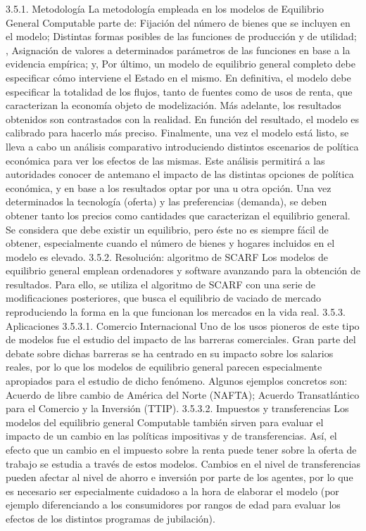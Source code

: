 \documentclass[10pt,a4paper]{article}
\begin{document}
3.5.1. Metodología
La metodología empleada en los modelos de Equilibrio General Computable parte de:
	Fijación del número de bienes que se incluyen en el modelo; 
	Distintas formas posibles de las funciones de producción y de utilidad; , 
	Asignación de valores a determinados parámetros de las funciones en base a la evidencia empírica; y,
	Por último, un modelo de equilibrio general completo debe especificar cómo interviene el Estado en el mismo.  
En definitiva, el modelo debe especificar la totalidad de los flujos, tanto de fuentes como de usos de renta, que caracterizan la economía objeto de modelización. 
Más adelante, los resultados obtenidos son contrastados con la realidad. En función del resultado, el modelo es calibrado para hacerlo más preciso. Finalmente, una vez el modelo está listo, se lleva a cabo un análisis comparativo introduciendo distintos escenarios de política económica para ver los efectos de las mismas. Este análisis permitirá a las autoridades conocer de antemano el impacto de las distintas opciones de política económica, y en base a los resultados optar por una u otra opción. Una vez determinados la tecnología (oferta) y las preferencias (demanda), se deben obtener tanto los precios como cantidades que caracterizan el equilibrio general. Se considera que debe existir un equilibrio, pero éste no es siempre fácil de obtener, especialmente cuando el número de bienes y hogares incluidos en el modelo es elevado.
3.5.2. Resolución: algoritmo de SCARF
Los modelos de equilibrio general emplean ordenadores y software avanzando para la obtención de resultados. Para ello, se utiliza el algoritmo de SCARF con una serie de modificaciones posteriores, que busca el equilibrio de vaciado de mercado reproduciendo la forma en la que funcionan los mercados en la vida real.  
3.5.3. Aplicaciones
3.5.3.1. Comercio Internacional
Uno de los usos pioneros de este tipo de modelos fue el estudio del impacto de las barreras comerciales. Gran parte del debate sobre dichas barreras se ha centrado en su impacto sobre los salarios reales, por lo que los modelos de equilibrio general parecen especialmente apropiados para el estudio de dicho fenómeno.
Algunos ejemplos concretos son:
	Acuerdo de libre cambio de América del Norte (NAFTA);  
	Acuerdo Transatlántico para el Comercio y la Inversión (TTIP).  
3.5.3.2. Impuestos y transferencias
Los modelos del equilibrio general Computable también sirven para evaluar el impacto de un cambio en las políticas impositivas y de transferencias. 
Así, el efecto que un cambio en el impuesto sobre la renta puede tener sobre la oferta de trabajo se estudia a través de estos modelos. Cambios en el nivel de transferencias pueden afectar al nivel de ahorro e inversión por parte de los agentes, por lo que es necesario ser especialmente cuidadoso a la hora de elaborar el modelo (por ejemplo diferenciando a los consumidores por rangos de edad para evaluar los efectos de los distintos programas de jubilación).
\end{document}
